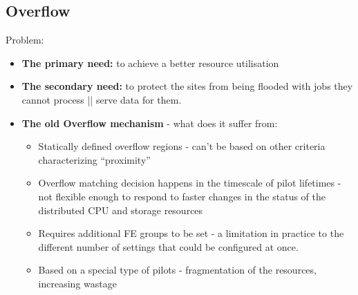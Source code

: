 \documentclass[8pt,mathserif,a4paper,oneside,pdf]{beamer}
\begin{document}
\subsection[Overflow]{Overflow}
\begin{frame}[fragile]{Problem:}

  \begin{itemize}
  \item
    \textbf{The primary need:} to achieve a better resource utilisation
  \item
    \textbf{The secondary need:} to protect the sites from being flooded with jobs they cannot process || serve data for them.
  \item
   \textbf{The old Overflow mechanism} - what does it suffer from:
    \begin{itemize}
    \item
      Statically defined overflow regions -  can't be based on other criteria characterizing ``proximity''
    \item
      Overflow matching decision happens in the timescale of pilot lifetimes -  not flexible enough to respond to faster changes in the status of the distributed CPU and storage resources
    \item
      Requires additional FE groups to be set - a limitation in practice to the different number of settings that could be configured at once.
    \item
      Based on a special type of pilots - fragmentation of the resources, increasing wastage
    \end{itemize}
  \end{itemize}

\end{frame}
\end{document}
